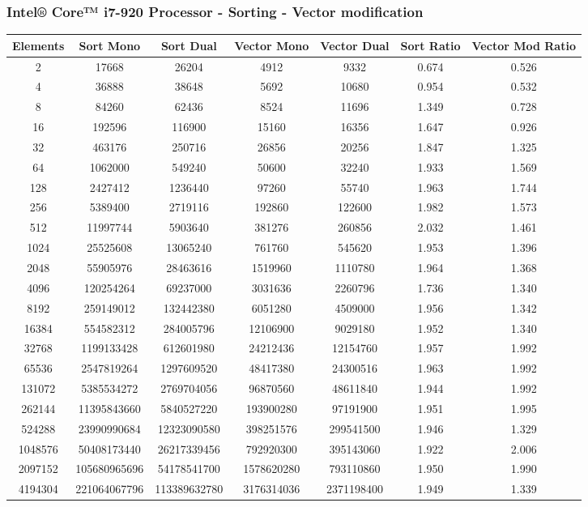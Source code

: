 \subsubsection{Intel® Core™ i7-920 Processor - Sorting - Vector modification }
\begin{center}
	\begin{tabular}{|c|c|c|c|c|c|c|}
		\hline	
			Elements & Sort Mono & Sort Dual & Vector Mono & Vector Dual & Sort Ratio & Vector Mod Ratio\\
		\hline
			2 & 17668 & 26204 & 4912 & 9332 & 0.674 & 0.526\\
		\hline
			4 & 36888 & 38648 & 5692 & 10680 & 0.954 & 0.532\\
		\hline
			8 & 84260 & 62436 & 8524 & 11696 & 1.349 & 0.728\\
		\hline
			16 & 192596 & 116900 & 15160 & 16356 & 1.647 & 0.926\\
		\hline
			32 & 463176 & 250716 & 26856 & 20256 & 1.847 & 1.325\\
		\hline
			64 & 1062000 & 549240 & 50600 & 32240 & 1.933 & 1.569\\
		\hline
			128 & 2427412 & 1236440 & 97260 & 55740 & 1.963 & 1.744\\
		\hline
			256 & 5389400 & 2719116 & 192860 & 122600 & 1.982 & 1.573\\
		\hline
			512 & 11997744 & 5903640 & 381276 & 260856 & 2.032 & 1.461\\
		\hline
			1024 & 25525608 & 13065240 & 761760 & 545620 & 1.953 & 1.396\\
		\hline
			2048 & 55905976 & 28463616 & 1519960 & 1110780 & 1.964 & 1.368\\
		\hline
			4096 & 120254264 & 69237000 & 3031636 & 2260796 & 1.736 & 1.340\\
		\hline
			8192 & 259149012 & 132442380 & 6051280 & 4509000 & 1.956 & 1.342\\
		\hline
			16384 & 554582312 & 284005796 & 12106900 & 9029180 & 1.952 & 1.340\\
		\hline
			32768 & 1199133428 & 612601980 & 24212436 & 12154760 & 1.957 & 1.992\\
		\hline
			65536 & 2547819264 & 1297609520 & 48417380 & 24300516 & 1.963 & 1.992\\
		\hline
			131072 & 5385534272 & 2769704056 & 96870560 & 48611840 & 1.944 & 1.992\\
		\hline
			262144 & 11395843660 & 5840527220 & 193900280 & 97191900 & 1.951 & 1.995\\
		\hline
			524288 & 23990990684 & 12323090580 & 398251576 & 299541500 & 1.946 & 1.329\\
		\hline
			1048576 & 50408173440 & 26217339456 & 792920300 & 395143060 & 1.922 & 2.006\\
		\hline
			2097152 & 105680965696 & 54178541700 & 1578620280 & 793110860 & 1.950 & 1.990\\
		\hline
			4194304 & 221064067796 & 113389632780 & 3176314036 & 2371198400 & 1.949 & 1.339\\
		\hline
	\end{tabular}
\end{center}

